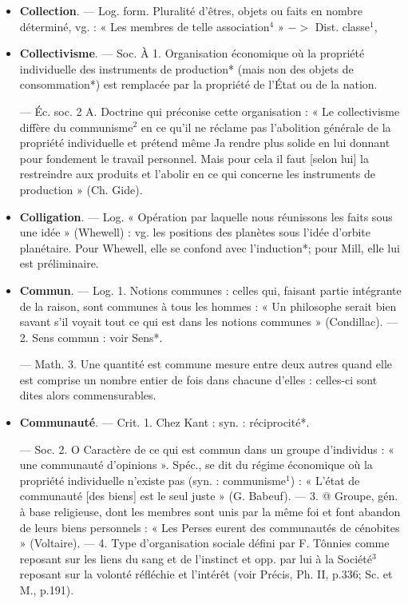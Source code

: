 \begin{itemize}[leftmargin=1cm, label=, itemsep=11pt]
\item {\bf Collection}. — Log. form. Pluralité
d'êtres, objets ou faits en nombre
déterminé, vg. : « Les membres de
telle association$^4$ » $->$ Dist. classe$^1$,

\item {\bf Collectivisme}. — Soc. À 1. Organisation économique où la propriété
individuelle des instruments de production* (mais non des objets de
consommation*) est remplacée par
la propriété de l’État ou de la nation.

— Éc. soc. 2 A. Doctrine qui préconise cette organisation : « Le collectivisme diffère du communisme$^2$
en ce qu'il ne réclame pas l'abolition
générale de la propriété individuelle
et prétend même Ja rendre plus
solide en lui donnant pour fondement le travail personnel. Mais pour
cela il faut [selon lui] la restreindre
aux produits et l’abolir en ce qui
concerne les instruments de production » (Ch. Gide).

\item {\bf Colligation}. — Log. « Opération par
laquelle nous réunissons les faits
sous une idée » (Whewell) : vg. les
positions des planètes sous l’idée
d’orbite planétaire. Pour Whewell,
elle se confond avec l’induction*;
pour Mill, elle lui est préliminaire.

\item {\bf Commun}. — Log. 1. Notions communes : celles qui, faisant partie intégrante de la raison, sont communes
à tous les hommes : « Un philosophe serait bien savant s’il voyait
tout ce qui est dans les notions
communes » (Condillac). — 2. Sens
commun : voir Sens*.

— Math. 3. Une quantité est
commune mesure entre deux autres
quand elle est comprise un nombre
entier de fois dans chacune d'elles :
celles-ci sont dites alors commensurables.

\item {\bf Communauté}. — Crit. 1. Chez Kant :
syn. : réciprocité*.

— Soc. 2. O Caractère de ce qui
est commun dans un groupe d’individus : « une communauté d’opinions ». Spéc., se dit du régime économique où la propriété individuelle n'existe pas (syn. : communisme$^1$) : « L'état de communauté
[des biens] est le seul juste » (G. Babeuf). — 3. @ Groupe, gén. à base
religieuse, dont les membres sont
unis par la même foi et font abandon
de leurs biens personnels : « Les
Perses eurent des communautés de
cénobites » (Voltaire). — 4. Type
d'organisation sociale défini par
F. Tônnies comme reposant sur les
liens du sang et de l'instinct et opp.
par lui à la Société$^3$ reposant sur la
volonté réfléchie et l'intérêt (voir
Précis, Ph. II, p.336; Sc. et M., p.191).


\end{itemize}
